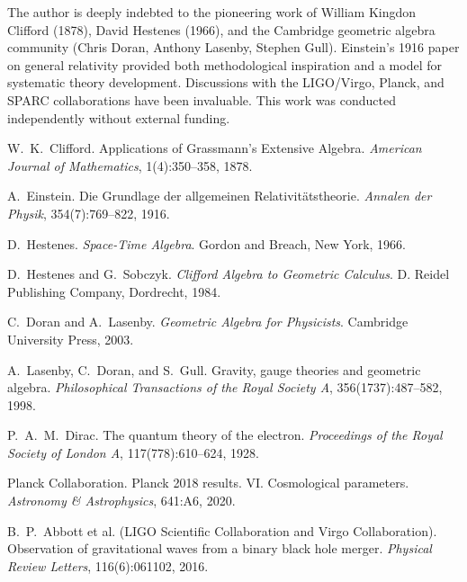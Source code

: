 \documentclass[11pt,a4paper]{article}
\numberwithin{equation}{section}
\theoremstyle{plain}
\theoremstyle{definition}
\theoremstyle{remark}
\begin{document}
The author is deeply indebted to the pioneering work of William Kingdon Clifford (1878), David Hestenes (1966), and the Cambridge geometric algebra community (Chris Doran, Anthony Lasenby, Stephen Gull). Einstein's 1916 paper on general relativity provided both methodological inspiration and a model for systematic theory development. Discussions with the LIGO/Virgo, Planck, and SPARC collaborations have been invaluable. This work was conducted independently without external funding.

\begin{thebibliography}{99}

W.~K.~Clifford.
\newblock Applications of Grassmann's Extensive Algebra.
\newblock \emph{American Journal of Mathematics}, 1(4):350--358, 1878.

A.~Einstein.
\newblock Die Grundlage der allgemeinen Relativitätstheorie.
\newblock \emph{Annalen der Physik}, 354(7):769--822, 1916.

D.~Hestenes.
\newblock \emph{Space-Time Algebra}.
\newblock Gordon and Breach, New York, 1966.

D.~Hestenes and G.~Sobczyk.
\newblock \emph{Clifford Algebra to Geometric Calculus}.
\newblock D. Reidel Publishing Company, Dordrecht, 1984.

C.~Doran and A.~Lasenby.
\newblock \emph{Geometric Algebra for Physicists}.
\newblock Cambridge University Press, 2003.

A.~Lasenby, C.~Doran, and S.~Gull.
\newblock Gravity, gauge theories and geometric algebra.
\newblock \emph{Philosophical Transactions of the Royal Society A}, 356(1737):487--582, 1998.

P.~A.~M.~Dirac.
\newblock The quantum theory of the electron.
\newblock \emph{Proceedings of the Royal Society of London A}, 117(778):610--624, 1928.

Planck Collaboration.
\newblock Planck 2018 results. VI. Cosmological parameters.
\newblock \emph{Astronomy \& Astrophysics}, 641:A6, 2020.

B.~P.~Abbott et al. (LIGO Scientific Collaboration and Virgo Collaboration).
\newblock Observation of gravitational waves from a binary black hole merger.
\newblock \emph{Physical Review Letters}, 116(6):061102, 2016.


\end{thebibliography}
\end{document}

